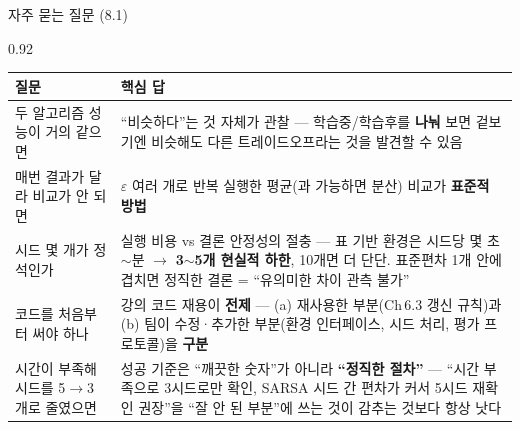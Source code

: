 \begin{frame}{자주 묻는 질문 (8.1)}
\begin{center}\begin{varwidth}{0.92\textwidth}
  \scriptsize
  \begin{tabular}{@{}p{}p{}@{}}
    \toprule
    질문 & 핵심 답 \\
    \midrule
    두 알고리즘 성능이 거의 같으면 & ``비슷하다''는 것 자체가 관찰 ---
      학습중/학습후를 \textbf{나눠} 보면 겉보기엔 비슷해도 다른
      트레이드오프라는 것을 발견할 수 있음 \\
    매번 결과가 달라 비교가 안 되면 & $\varepsilon$ 여러 개로 반복 실행한
      평균(과 가능하면 분산) 비교가 \textbf{표준적 방법} \\
    시드 몇 개가 정석인가 & 실행 비용 vs 결론 안정성의 절충 --- 표 기반
      환경은 시드당 몇 초$\sim$분 $\to$ \textbf{3$\sim$5개 현실적 하한},
      10개면 더 단단. 표준편차 1개 안에 겹치면 정직한 결론 =
      ``유의미한 차이 관측 불가'' \\
    코드를 처음부터 써야 하나 & 강의 코드 재용이 \textbf{전제} ---
      (a) 재사용한 부분(Ch\,6.3 갱신 규칙)과 (b) 팀이 수정·추가한
      부분(환경 인터페이스, 시드 처리, 평가 프로토콜)을 \textbf{구분} \\
    \midrule
    시간이 부족해 시드를 5$\to$3개로 줄였으면 & 성공 기준은 ``깨끗한
      숫자''가 아니라 \textbf{``정직한 절차''} --- ``시간 부족으로
      3시드로만 확인, SARSA 시드 간 편차가 커서 5시드 재확인 권장''을
      ``잘 안 된 부분''에 쓰는 것이 감추는 것보다 항상 낫다 \\
    \bottomrule
  \end{tabular}
\end{varwidth}\end{center}
\end{frame}
